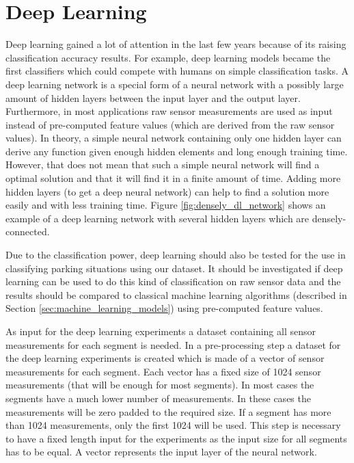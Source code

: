 \section{Deep Learning}
\label{sec:deep_learning}

Deep learning gained a lot of attention in the last few years because of its raising classification accuracy results. For example, deep learning models became the first classifiers which could compete with humans on simple classification tasks. A deep learning network is a special form of a neural network with a possibly large amount of hidden layers between the input layer and the output layer. Furthermore, in most applications raw sensor measurements are used as input instead of pre-computed feature values (which are derived from the raw sensor values). In theory, a simple neural network containing only one hidden layer can derive any function given enough hidden elements and long enough training time. However, that does not mean that such a simple neural network will find a optimal solution and that it will find it in a finite amount of time. Adding more hidden layers (to get a deep neural network) can help to find a solution more easily and with less training time. 
Figure \ref{fig:densely_dl_network} shows an example of a deep learning network with several hidden layers which are densely-connected.

Due to the classification power, deep learning should also be tested for the use in classifying parking situations using our dataset. It should be investigated if deep learning can be used to do this kind of classification on raw sensor data and the results should be compared to classical machine learning algorithms (described in Section \ref{sec:machine_learning_models}) using pre-computed feature values.


As input for the deep learning experiments a dataset containing all sensor measurements for each segment is needed. In a pre-processing step a dataset for the deep learning experiments is created which is made of a vector of sensor measurements for each segment. Each vector has a fixed size of 1024 sensor measurements (that will be enough for most segments). In most cases the segments have a much lower number of measurements. In these cases the measurements will be zero padded to the required size. If a segment has more than 1024 measurements, only the first 1024 will be used. This step is necessary to have a fixed length input for the experiments as the input size for all segments has to be equal. A vector represents the input layer of the neural network. 

